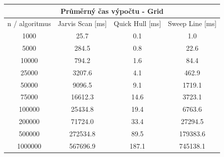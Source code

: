 \documentclass[a4paper, 12pt]{article}
\begin{document}
\begin{table}[]
\centering
\begin{tabular}{|c|c|c|c|}
\hline
\multicolumn{4}{|c|}{\textbf{Průměrný čas výpočtu - Grid}}                        \\ \hline
n / algoritmus & Jarvis Scan {[}ms{]} & Quick Hull {[}ms{]} & Sweep Line {[}ms{]} \\ \hline
1000           & 25.7                 & 0.1                 & 1.0                 \\ \hline
5000           & 284.5                & 0.8                 & 22.6                \\ \hline
10000          & 794.2                & 1.6                 & 84.4                \\ \hline
25000          & 3207.6               & 4.1                 & 462.9               \\ \hline
50000          & 9096.5               & 9.1                 & 1719.1              \\ \hline
75000          & 16612.3              & 14.6                & 3723.1              \\ \hline
100000         & 25434.8              & 19.4                & 6763.6              \\ \hline
200000         & 71724.0              & 33.4                & 27294.5             \\ \hline
500000         & 272534.8             & 89.5                & 179383.6            \\ \hline
1000000        & 567696.9             & 187.1               & 745138.1            \\ \hline
\end{tabular}
\end{table}
\end{document}
